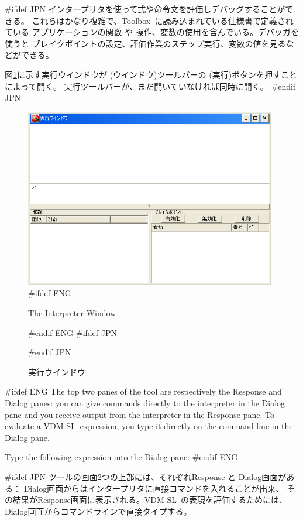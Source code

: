 \documentclass[\pformat,12pt]{article}
\newcommand{\vdmslpp}{VDM-SL}
\newcommand{\Toolbox}{Toolbox}
\newcommand{\vdmslpp}{VDM++}
\newcommand{\Toolbox}{Toolbox}
\newcommand{\guicmd}[1]{{\sf #1}}
\newcommand{\guicmd}[1]{{\gt #1}}
\begin{document}
#ifdef JPN
インタープリタを使って式や命令文を評価しデバッグすることができる。
これらはかなり複雑で、\Toolbox\ に読み込まれている仕様書で定義されている
アプリケーションの関数 や 操作、変数の使用を含んでいる。デバッガを使うと
ブレイクポイントの設定、評価作業のステップ実行、変数の値を見るなどができる。

図\ref{fig:interpwin}に示す\guicmd{実行ウインドウ}が
(\guicmd{ウインドウ})ツールバーの  
(\guicmd{実行})ボタンを押すことによって開く。
\guicmd{実行}ツールバーが、まだ開いていなければ同時に開く。
#endif JPN


\begin{figure}[tbh]
\begin{center}
\includegraphics[width=11cm]{interpreterWindow.png}
#ifdef ENG
\caption{The Interpreter Window}
#endif ENG
#ifdef JPN
\caption{実行ウインドウ}
#endif JPN
\label{fig:interpwin}
\end{center}
\end{figure}

#ifdef ENG
The top two panes of the tool are respectively the
\guicmd{Response} and \guicmd{Dialog} panes: you
can give commands directly to the interpreter in the
\guicmd{Dialog} pane and you receive output from the
interpreter in the \guicmd{Response} pane. To evaluate a \vdmslpp\
expression, you type it directly on the command line in the
\guicmd{Dialog} pane.

Type the following expression into the \guicmd{Dialog} pane:
#endif ENG

#ifdef JPN
ツールの画面2つの上部には、それぞれ\guicmd{Response}  と \guicmd{Dialog}画面がある：
\guicmd{Dialog}画面からはインタープリタに直接コマンドを入れることが出来、
その結果が\guicmd{Response}画面に表示される。\vdmslpp\ の表現を評価するためには、
\guicmd{Dialog}画面からコマンドラインで直接タイプする。 
\end{document}
